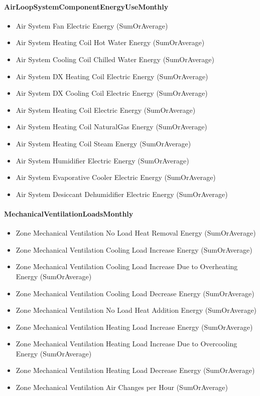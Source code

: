 \paragraph{AirLoopSystemComponentEnergyUseMonthly}\label{airloopsystemcomponentenergyusemonthly}

\begin{itemize}
\item
  Air System Fan Electric Energy (SumOrAverage)
\item
  Air System Heating Coil Hot Water Energy (SumOrAverage)
\item
  Air System Cooling Coil Chilled Water Energy (SumOrAverage)
\item
  Air System DX Heating Coil Electric Energy (SumOrAverage)
\item
  Air System DX Cooling Coil Electric Energy (SumOrAverage)
\item
  Air System Heating Coil Electric Energy (SumOrAverage)
\item
  Air System Heating Coil NaturalGas Energy (SumOrAverage)
\item
  Air System Heating Coil Steam Energy (SumOrAverage)
\item
  Air System Humidifier Electric Energy (SumOrAverage)
\item
  Air System Evaporative Cooler Electric Energy (SumOrAverage)
\item
  Air System Desiccant Dehumidifier Electric Energy (SumOrAverage)
\end{itemize}

\paragraph{MechanicalVentilationLoadsMonthly}\label{mechanicalventilationloadsmonthly}

\begin{itemize}
\item
  Zone Mechanical Ventilation No Load Heat Removal Energy (SumOrAverage)
\item
  Zone Mechanical Ventilation Cooling Load Increase Energy (SumOrAverage)
\item
  Zone Mechanical Ventilation Cooling Load Increase Due to Overheating Energy (SumOrAverage)
\item
  Zone Mechanical Ventilation Cooling Load Decrease Energy (SumOrAverage)
\item
  Zone Mechanical Ventilation No Load Heat Addition Energy (SumOrAverage)
\item
  Zone Mechanical Ventilation Heating Load Increase Energy (SumOrAverage)
\item
  Zone Mechanical Ventilation Heating Load Increase Due to Overcooling Energy (SumOrAverage)
\item
  Zone Mechanical Ventilation Heating Load Decrease Energy (SumOrAverage)
\item
  Zone Mechanical Ventilation Air Changes per Hour (SumOrAverage)
\end{itemize}

